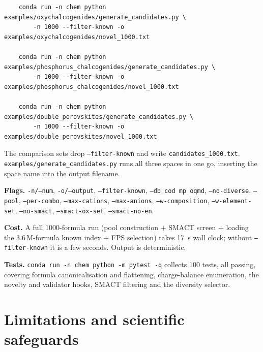 \documentclass[11pt,a4paper]{article}
\newcommand{\code}[1]{\texttt{#1}}
\newcommand{\cmd}[1]{\texttt{\small #1}}
\begin{document}
{\footnotesize
\begin{verbatim}
    conda run -n chem python examples/oxychalcogenides/generate_candidates.py \
        -n 1000 --filter-known -o examples/oxychalcogenides/novel_1000.txt

    conda run -n chem python examples/phosphorus_chalcogenides/generate_candidates.py \
        -n 1000 --filter-known -o examples/phosphorus_chalcogenides/novel_1000.txt

    conda run -n chem python examples/double_perovskites/generate_candidates.py \
        -n 1000 --filter-known -o examples/double_perovskites/novel_1000.txt
\end{verbatim}
\par}

{\sloppy
The comparison sets drop \cmd{--filter-known} and write
\code{candidates\_\allowbreak 1000.txt}.
\cmd{examples/\allowbreak generate\_candidates.py} runs all three spaces in one go, inserting the
space name into the output filename.

\textbf{Flags.} \cmd{-n/--num}, \cmd{-o/--output}, \cmd{--filter-known}, \cmd{--db cod mp oqmd},
\cmd{--no-diverse}, \cmd{--pool}, \cmd{--per-combo}, \cmd{--max-cations}, \cmd{--max-anions},
\cmd{--w-composition}, \cmd{--w-element-set}, \cmd{--no-smact}, \cmd{--smact-ox-set},
\cmd{--smact-no-en}.
\par}

\textbf{Cost.} A full 1000-formula run (pool construction $+$ SMACT screen $+$ loading the
3.6\,M-formula known index $+$ FPS selection) takes \SI{17}{s} wall clock; without
\cmd{--filter-known} it is a few seconds. Output is deterministic.

\textbf{Tests.} \cmd{conda run -n chem python -m pytest -q} collects 100 tests, all passing,
covering formula canonicalisation and flattening, charge-balance enumeration, the novelty and
validator hooks, SMACT filtering and the diversity selector.

\section{Limitations and scientific safeguards}
\end{document}
